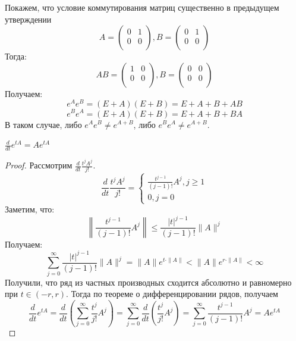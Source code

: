 \begin{example}
    Покажем, что условие коммутирования матриц существенно в предыдущем утверждении
    \[A = \left( \begin{array}{cc}
        0 & 1 \\
        0 & 0 \\
    \end{array} \right), B = \left( \begin{array}{cc}
        0 & 1 \\
        0 & 0 \\
    \end{array} \right)\]
    Тогда:
    \[AB = \left( \begin{array}{cc}
        1 & 0 \\
        0 & 0 \\
    \end{array} \right), B = \left( \begin{array}{cc}
        0 & 0 \\
        0 & 0 \\
    \end{array} \right)\]
    Получаем:
    \[e^Ae^B = (E + A)(E + B) = E + A + B + AB\]
    \[e^Be^A = (E + A)(E + B) = E + A + B + BA\]
    В таком случае, либо \(e^Ae^B \ne e^{A + B}\), либо \(e^Be^A \ne e^{A + B}\).
\end{example}

\begin{proposition}
    \(\frac{d}{dt}e^{tA} = Ae^{tA}\)
\end{proposition}
\begin{proof}
    Рассмотрим \(\frac{d}{dt} \frac{t^jA^j}{j!}\).
    \[\frac{d}{dt} \frac{t^jA^j}{j!} = \left\{\begin{array}{l}
        \frac{t^{j - 1}}{(j - 1)!}A^j, j \ge 1 \\
        0, j = 0
    \end{array}\right.\]
    Заметим, что:
    \[\left\|\frac{t^{j - 1}}{(j - 1)!}A^j\right\| \le \frac{|t|^{j - 1}}{(j - 1)!}\|A\|^j\]
    Получаем:
    \[\sum_{j = 0}^\infty \frac{|t|^{j - 1}}{(j - 1)!}\|A\|^j = \|A\|e^{t\cdot\|A\|} < \|A\|e^{r\cdot\|A\|} < \infty\]
    Получили, что ряд из частных производных сходится абсолютно и равномерно при \(t \in (-r, r)\). Тогда по теореме о дифференцировании рядов, получаем
    \[\frac{d}{dt}e^{tA} = \frac{d}{dt}\left( \sum_{j = 0}^\infty \frac{t^{j}}{j!}A^j \right) = \sum_{j = 0}^\infty \frac{d}{dt}\left( \frac{t^{j}}{j!}A^j \right) = \sum_{j = 0}^\infty \frac{t^{j - 1}}{(j - 1)!}A^j = Ae^{tA}\]
\end{proof}

